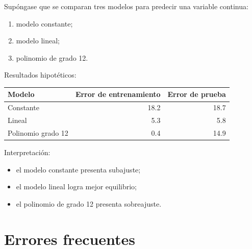 \documentclass[
  spanish,
  10.5pt,
  letterpaper,
  DIV=11,
  numbers=noendperiod,
  oneside,
  open=any]{scrreprt}
\newcounter{none} %
\providecommand{\tightlist}{%
  \setlength{\itemsep}{0pt}\setlength{\parskip}{0pt}}
\theoremstyle{definition}
\theoremstyle{definition}
\theoremstyle{plain}
\theoremstyle{remark}
\begin{document}

Supóngase que se comparan tres modelos para predecir una variable
continua:

\begin{enumerate}
\def\labelenumi{\arabic{enumi}.}
\tightlist
\item
  modelo constante;
\item
  modelo lineal;
\item
  polinomio de grado 12.
\end{enumerate}

Resultados hipotéticos:

{\def\LTcaptype{none} %
\begin{longtable}[]{@{}lrr@{}}
\toprule\noalign{}
Modelo & Error de entrenamiento & Error de prueba \\
\midrule\noalign{}
\endhead
\bottomrule\noalign{}
\endlastfoot
Constante & 18.2 & 18.7 \\
Lineal & 5.3 & 5.8 \\
Polinomio grado 12 & 0.4 & 14.9 \\
\end{longtable}
}

Interpretación:

\begin{itemize}
\tightlist
\item
  el modelo constante presenta subajuste;
\item
  el modelo lineal logra mejor equilibrio;
\item
  el polinomio de grado 12 presenta sobreajuste.
\end{itemize}

\section*{Errores frecuentes}\label{errores-frecuentes-4}

\end{document}
